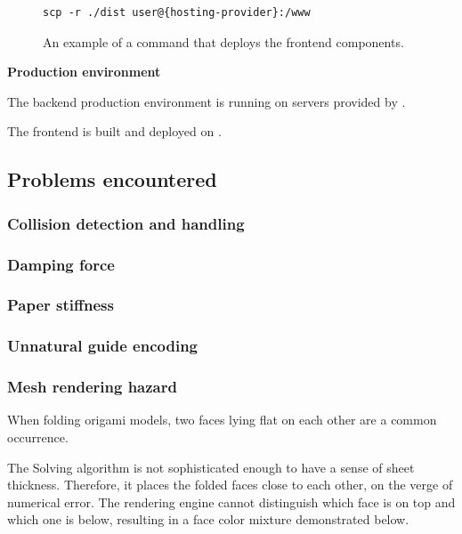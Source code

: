 \begin{figure}[H]
	\caption{An example of a command that deploys the frontend components.}
	\begin{lstlisting}
scp -r ./dist user@{hosting-provider}:/www 
	\end{lstlisting}
\end{figure}
\medskip

\textbf{Production environment}

The backend production environment is running on servers provided by .

\medskip
The frontend is built and deployed on .






\subsection{Problems encountered}
\subsubsection{Collision detection and handling}
\subsubsection{Damping force}
\subsubsection{Paper stiffness}
\subsubsection{Unnatural guide encoding}

\subsubsection{Mesh rendering hazard}

When folding origami models, two faces lying flat on each other are a common occurrence.

The Solving algorithm is not sophisticated enough to have a sense of sheet thickness. Therefore, it places the folded faces close to each other, on the verge of numerical error. The rendering engine cannot distinguish which face is on top and which one is below, resulting in a face color mixture demonstrated below.


